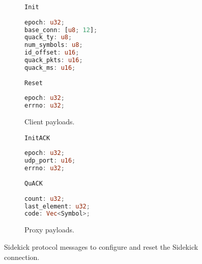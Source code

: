 \begin{figure}[t]
    \begin{subfigure}[b]{0.48\linewidth}
        \begin{protopayload}{\texttt{Init}}
            \begin{lstlisting}[language=Rust,basicstyle=\footnotesize]
epoch: u32;
base_conn: [u8; 12];
quack_ty: u8;
num_symbols: u8;
id_offset: u16;
quack_pkts: u16;
quack_ms: u16;
            \end{lstlisting}
        \end{protopayload}
        \begin{protopayload}{\texttt{Reset}}
            \begin{lstlisting}[language=Rust,basicstyle=\footnotesize]
epoch: u32;
errno: u32;
            \end{lstlisting}
        \end{protopayload}
        \caption{Client payloads.}
        \label{fig:sidekick:payloads:client}
    \end{subfigure}
    \hfill
    \begin{subfigure}[b]{0.48\linewidth}
        \begin{protopayload}{\texttt{InitACK}}
            \begin{lstlisting}[language=Rust,basicstyle=\footnotesize]
epoch: u32;
udp_port: u16;
errno: u32;
            \end{lstlisting}
        \end{protopayload}
        \begin{protopayload}{\texttt{QuACK}}
            \begin{lstlisting}[language=Rust,basicstyle=\footnotesize]
count: u32;
last_element: u32;
code: Vec<Symbol>;
            \end{lstlisting}
        \end{protopayload}
        \caption{Proxy payloads.}
        \label{fig:sidekick:payloads:proxy}
    \end{subfigure}
  \caption{Sidekick protocol messages to configure and reset the Sidekick
  connection.}
  \label{fig:sidekick:payloads}
\end{figure}
